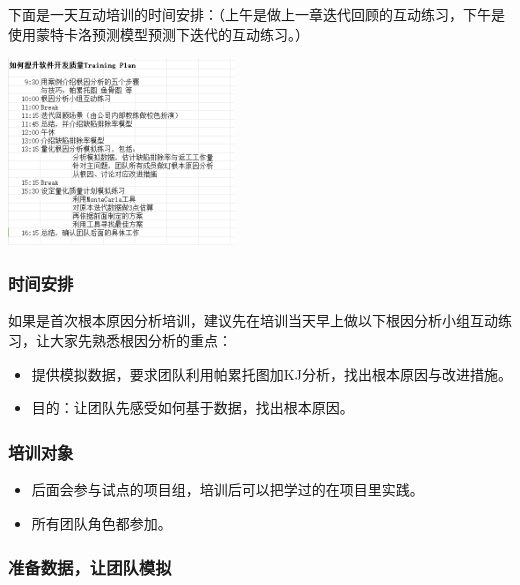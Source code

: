 下面是一天互动培训的时间安排：（上午是做上一章迭代回顾的互动练习，下午是使用蒙特卡洛预测模型预测下迭代的互动练习。）


\includegraphics[width=6cm]{微信截图_20230830093612.png}

\hypertarget{ux65f6ux95f4ux5b89ux6392}{%
\subsubsection{时间安排}\label{ux65f6ux95f4ux5b89ux6392}}

如果是首次根本原因分析培训，建议先在培训当天早上做以下根因分析小组互动练习，让大家先熟悉根因分析的重点：

\begin{itemize}
\tightlist
\item
  提供模拟数据，要求团队利用帕累托图加KJ分析，找出根本原因与改进措施。
\item
  目的：让团队先感受如何基于数据，找出根本原因。
\end{itemize}

\hypertarget{ux57f9ux8badux5bf9ux8c61}{%
\subsubsection{培训对象}\label{ux57f9ux8badux5bf9ux8c61}}

\begin{itemize}
\tightlist
\item
  后面会参与试点的项目组，培训后可以把学过的在项目里实践。
\item
  所有团队角色都参加。
\end{itemize}

\hypertarget{ux51c6ux5907ux6570ux636eux8ba9ux56e2ux961fux6a21ux62df}{%
\subsubsection{准备数据，让团队模拟}\label{ux51c6ux5907ux6570ux636eux8ba9ux56e2ux961fux6a21ux62df}}


